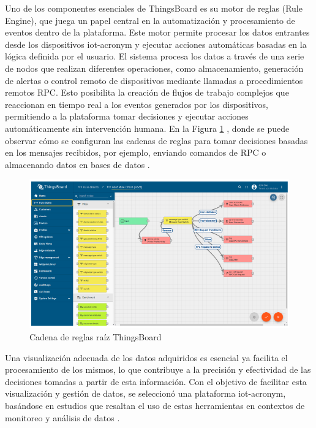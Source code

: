 Uno de los componentes esenciales de ThingsBoard es su motor de reglas (Rule Engine), que juega un papel central en la automatización y procesamiento de eventos dentro de la plataforma. Este motor permite procesar los datos entrantes desde los dispositivos \acrshort{iot-acronym} y ejecutar acciones automáticas basadas en la lógica definida por el usuario. El sistema procesa los datos a través de una serie de nodos que realizan diferentes operaciones, como almacenamiento, generación de alertas o control remoto de dispositivos mediante llamadas a procedimientos remotos RPC. Esto posibilita la creación de flujos de trabajo complejos que reaccionan en tiempo real a los eventos generados por los dispositivos, permitiendo a la plataforma tomar decisiones y ejecutar acciones automáticamente sin intervención humana. 
En la Figura \ref{fig:ruleengine} , donde se puede observar cómo se configuran las cadenas de reglas para tomar decisiones basadas en los mensajes recibidos, por ejemplo, enviando comandos de RPC o almacenando datos en bases de datos \cite{ThingsBoard}.

\begin{figure}[H]
\leavevmode
\begin{minipage}{\textwidth}
\begin{center}
\includegraphics[width=\textwidth]{./capitulo_03/figures/SW/ruleengine.png}
\caption{Cadena de reglas raíz ThingsBoard\label{fig:ruleengine}}
\end{center}
\end{minipage}
\end{figure}

Una visualización adecuada de los datos adquiridos es esencial ya facilita el procesamiento de los mismos, lo que contribuye a la precisión y efectividad de las decisiones tomadas a partir de esta información.  Con el objetivo de facilitar esta visualización y gestión de datos, se seleccionó una plataforma \acrshort{iot-acronym}, basándose en estudios que resaltan el uso de estas herramientas en contextos de monitoreo y análisis de datos \cite{Alquhali2019IOT, Nwankwo2022IoT-Assisted, Santa2019LPWAN-Based, Suwaid2019Embedded, Alavi2019State, K2023IoT}. 

